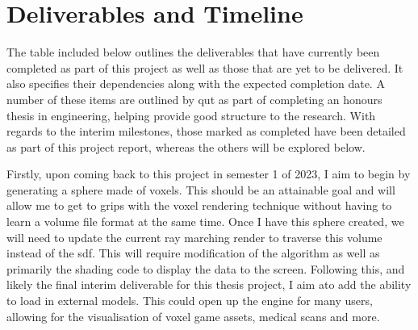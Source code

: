 \documentclass[titlepage]{article}
\begin{document}
\section{Deliverables and Timeline}
The table included below outlines the deliverables that have currently been completed as part of this project as well as those that are yet to be delivered. It also specifies their dependencies along with the expected completion date. A number of these items are outlined by \acrshort{qut} as part of completing an honours thesis in engineering, helping provide good structure to the research. With regards to the interim milestones, those marked as completed have been detailed as part of this project report, whereas the others will be explored below.

Firstly, upon coming back to this project in semester 1 of 2023, I aim to begin by generating a sphere made of voxels. This should be an attainable goal and will allow me to get to grips with the voxel rendering technique without having to learn a volume file format at the same time. Once I have this sphere created, we will need to update the current ray marching render to traverse this volume instead of the \acrshort{sdf}. This will require modification of the algorithm as well as primarily the shading code to display the data to the screen. Following this, and likely the final interim deliverable for this thesis project, I aim ato add the ability to load in external models. This could open up the engine for many users, allowing for the visualisation of voxel game assets, medical scans and more.
\end{document}
